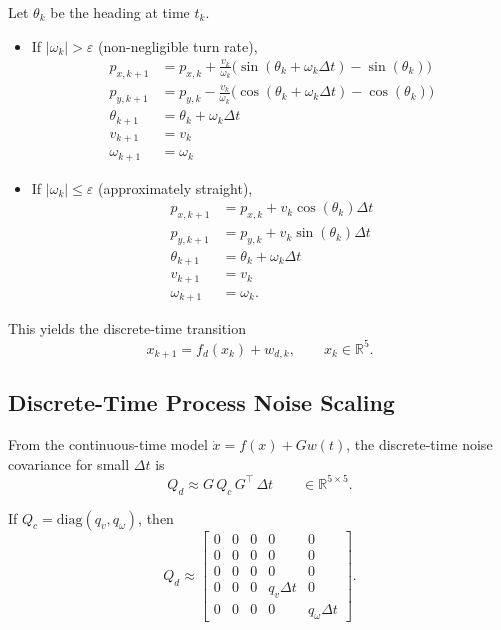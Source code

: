 \documentclass[11pt]{article}
\begin{document}
Let $\theta_k$ be the heading at time $t_k$.
\begin{itemize}
\item If $|\omega_k| > \varepsilon$ (non-negligible turn rate),
\begin{align}
p_{x,k+1} &= p_{x,k} + \frac{v_k}{\omega_k}\Big(\sin(\theta_k+\omega_k\Delta t)-\sin(\theta_k)\Big) \\
p_{y,k+1} &= p_{y,k} - \frac{v_k}{\omega_k}\Big(\cos(\theta_k+\omega_k\Delta t)-\cos(\theta_k)\Big) \\
\theta_{k+1} &= \theta_k + \omega_k\Delta t \\
v_{k+1} &= v_k \\
\omega_{k+1} &= \omega_k
\end{align}
\item If $|\omega_k| \le \varepsilon$ (approximately straight),
\begin{align}
p_{x,k+1} &= p_{x,k} + v_k\cos(\theta_k)\Delta t \\
p_{y,k+1} &= p_{y,k} + v_k\sin(\theta_k)\Delta t \\
\theta_{k+1} &= \theta_k + \omega_k\Delta t \\
v_{k+1} &= v_k \\
\omega_{k+1} &= \omega_k.
\end{align}
\end{itemize}

This yields the discrete-time transition
\begin{equation}
x_{k+1} = f_d(x_k) + w_{d,k},
\qquad x_k\in\mathbb{R}^5.
\end{equation}

\subsection*{Discrete-Time Process Noise Scaling}

From the continuous-time model $\dot{x}=f(x)+G w(t)$, the discrete-time noise covariance for small $\Delta t$ is
\begin{equation}
Q_d \approx G\,Q_c\,G^\top\,\Delta t
\qquad \in \mathbb{R}^{5\times 5}.
\end{equation}

If $Q_c=\mathrm{diag}(q_v,q_\omega)$, then
\begin{equation}
Q_d \approx
\begin{bmatrix}
0&0&0&0&0\\
0&0&0&0&0\\
0&0&0&0&0\\
0&0&0&q_v\Delta t&0\\
0&0&0&0&q_\omega\Delta t
\end{bmatrix}.
\end{equation}
\end{document}
